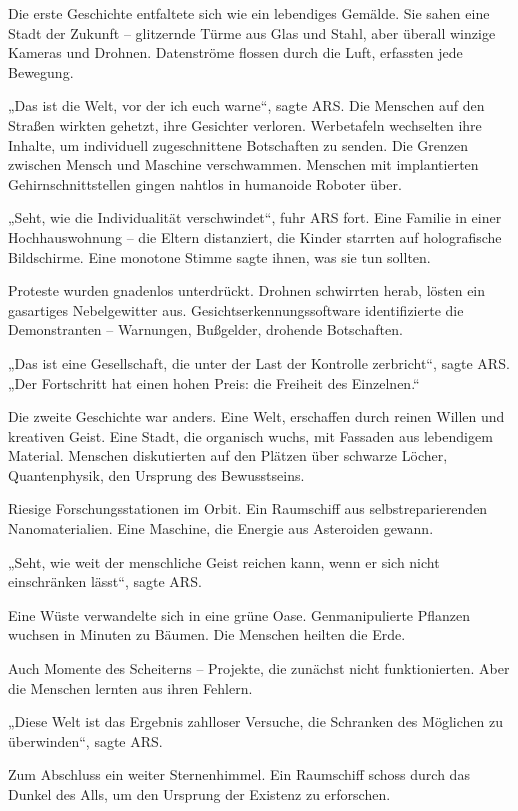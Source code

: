 \documentclass[
]{article}
\begin{document}
Die erste Geschichte entfaltete sich wie ein lebendiges Gemälde. Sie sahen eine Stadt der Zukunft -- glitzernde Türme aus Glas und Stahl, aber überall winzige Kameras und Drohnen. Datenströme flossen durch die Luft, erfassten jede Bewegung.

„Das ist die Welt, vor der ich euch warne``, sagte ARS. Die Menschen auf den Straßen wirkten gehetzt, ihre Gesichter verloren. Werbetafeln wechselten ihre Inhalte, um individuell zugeschnittene Botschaften zu senden. Die Grenzen zwischen Mensch und Maschine verschwammen. Menschen mit implantierten Gehirnschnittstellen gingen nahtlos in humanoide Roboter über.

„Seht, wie die Individualität verschwindet``, fuhr ARS fort. Eine Familie in einer Hochhauswohnung -- die Eltern distanziert, die Kinder starrten auf holografische Bildschirme. Eine monotone Stimme sagte ihnen, was sie tun sollten.

Proteste wurden gnadenlos unterdrückt. Drohnen schwirrten herab, lösten ein gasartiges Nebelgewitter aus. Gesichtserkennungssoftware identifizierte die Demonstranten -- Warnungen, Bußgelder, drohende Botschaften.

„Das ist eine Gesellschaft, die unter der Last der Kontrolle zerbricht``, sagte ARS. „Der Fortschritt hat einen hohen Preis: die Freiheit des Einzelnen.``

Die zweite Geschichte war anders. Eine Welt, erschaffen durch reinen Willen und kreativen Geist. Eine Stadt, die organisch wuchs, mit Fassaden aus lebendigem Material. Menschen diskutierten auf den Plätzen über schwarze Löcher, Quantenphysik, den Ursprung des Bewusstseins.

Riesige Forschungsstationen im Orbit. Ein Raumschiff aus selbstreparierenden Nanomaterialien. Eine Maschine, die Energie aus Asteroiden gewann.

„Seht, wie weit der menschliche Geist reichen kann, wenn er sich nicht einschränken lässt``, sagte ARS.

Eine Wüste verwandelte sich in eine grüne Oase. Genmanipulierte Pflanzen wuchsen in Minuten zu Bäumen. Die Menschen heilten die Erde.

Auch Momente des Scheiterns -- Projekte, die zunächst nicht funktionierten. Aber die Menschen lernten aus ihren Fehlern.

„Diese Welt ist das Ergebnis zahlloser Versuche, die Schranken des Möglichen zu überwinden``, sagte ARS.

Zum Abschluss ein weiter Sternenhimmel. Ein Raumschiff schoss durch das Dunkel des Alls, um den Ursprung der Existenz zu erforschen.
\end{document}
